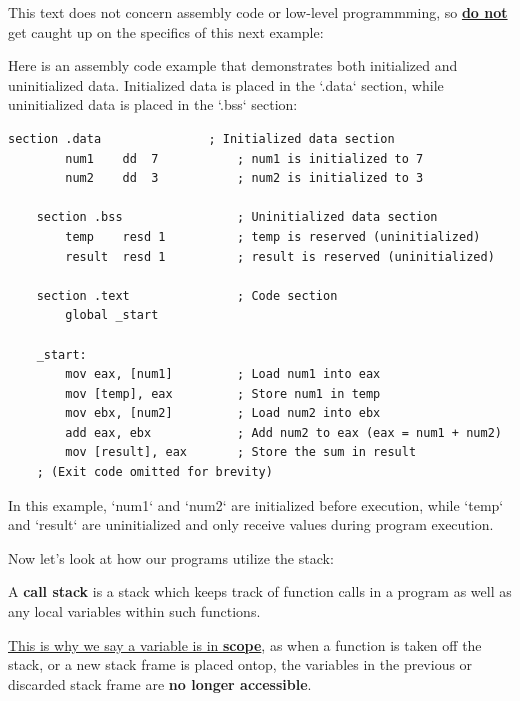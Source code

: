 \newpage

\noindent
This text does not concern assembly code or low-level programmming, so \underline{\textbf{do not}} get caught up on the specifics of this next example:
\begin{Example}
    Here is an assembly code example that demonstrates both initialized and uninitialized data. 
    Initialized data is placed in the `.data` section, while uninitialized data is placed in the `.bss` section:

    \begin{lstlisting}[language={[x86masm]Assembler}, numbers=none]
    section .data               ; Initialized data section
        num1    dd  7           ; num1 is initialized to 7
        num2    dd  3           ; num2 is initialized to 3

    section .bss                ; Uninitialized data section
        temp    resd 1          ; temp is reserved (uninitialized)
        result  resd 1          ; result is reserved (uninitialized)

    section .text               ; Code section
        global _start

    _start:
        mov eax, [num1]         ; Load num1 into eax
        mov [temp], eax         ; Store num1 in temp
        mov ebx, [num2]         ; Load num2 into ebx
        add eax, ebx            ; Add num2 to eax (eax = num1 + num2)
        mov [result], eax       ; Store the sum in result
    ; (Exit code omitted for brevity)
    \end{lstlisting}

    \noindent
    In this example, `num1` and `num2` are initialized before execution, while `temp` and `result` are uninitialized and only receive values during program execution.
\end{Example}

\noindent
Now let's look at how our programs utilize the stack:
\begin{Def}

    A \textbf{call stack} is a stack which keeps track of function calls in a program as well as any local variables within such functions.
    
    \underline{This is why we say a variable is in \textbf{scope}}, as when a function is taken off the stack, or a new stack frame 
    is placed ontop, the variables in the previous or discarded stack frame are \textbf{no longer accessible}.
\end{Def}

